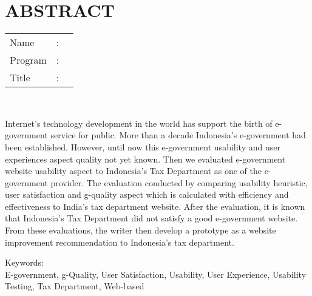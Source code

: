 %
%
%

	\chapter*{ABSTRACT}

\vspace*{0.2cm}

\noindent \begin{tabular}{l l p{11.0cm}}
	Name&: & \penulis \\
	Program&: & \programEng \\
	Title&: & \judulInggris \\
\end{tabular} \\ 

\vspace*{0.5cm}

\noindent 
Internet's technology development in the world has support the birth of e-government service for public. More than a decade Indonesia's e-government had been established. However, until now this e-government usability and user experiences aspect quality not yet known. Then we evaluated e-government website usability aspect to Indonesia's Tax Department as one of the e-government provider. The evaluation conducted by comparing usability heuristic, user satisfaction and g-quality aspect which is calculated with efficiency and effectiveness to India's tax department website. After the evaluation, it is known that Indonesia's Tax Department did not satisfy a good e-government website. From these evaluations, the writer then develop a prototype as a website improvement recommendation to Indonesia's tax department.

\vspace*{0.2cm}

\noindent Keywords: \\ 
\noindent E-government, g-Quality, User Satisfaction, Usability, User Experience, Usability Testing, Tax Department, Web-based\\

\newpage
